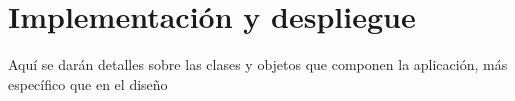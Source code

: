 \chapter{Implementación y despliegue}
Aquí se darán detalles sobre las clases y objetos que componen la aplicación, más específico que en el diseño